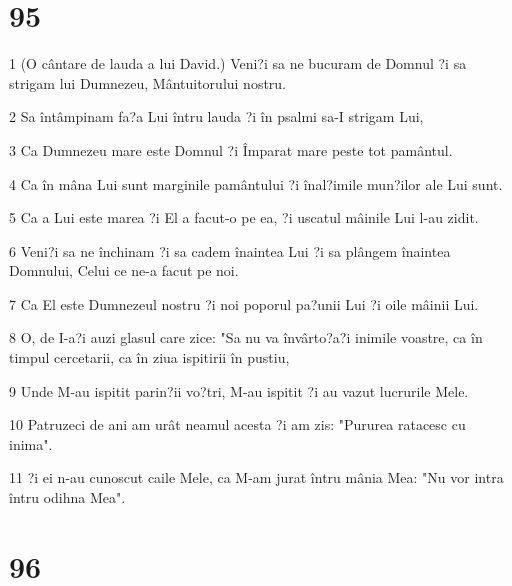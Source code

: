 \chapter{95}

\par 1 (O cântare de lauda a lui David.) Veni?i sa ne bucuram de Domnul ?i sa strigam lui Dumnezeu, Mântuitorului nostru.
\par 2 Sa întâmpinam fa?a Lui întru lauda ?i în psalmi sa-I strigam Lui,
\par 3 Ca Dumnezeu mare este Domnul ?i Împarat mare peste tot pamântul.
\par 4 Ca în mâna Lui sunt marginile pamântului ?i înal?imile mun?ilor ale Lui sunt.
\par 5 Ca a Lui este marea ?i El a facut-o pe ea, ?i uscatul mâinile Lui l-au zidit.
\par 6 Veni?i sa ne închinam ?i sa cadem înaintea Lui ?i sa plângem înaintea Domnului, Celui ce ne-a facut pe noi.
\par 7 Ca El este Dumnezeul nostru ?i noi poporul pa?unii Lui ?i oile mâinii Lui.
\par 8 O, de I-a?i auzi glasul care zice: "Sa nu va învârto?a?i inimile voastre, ca în timpul cercetarii, ca în ziua ispitirii în pustiu,
\par 9 Unde M-au ispitit parin?ii vo?tri, M-au ispitit ?i au vazut lucrurile Mele.
\par 10 Patruzeci de ani am urât neamul acesta ?i am zis: "Pururea ratacesc cu inima".
\par 11 ?i ei n-au cunoscut caile Mele, ca M-am jurat întru mânia Mea: "Nu vor intra întru odihna Mea".

\chapter{96}

